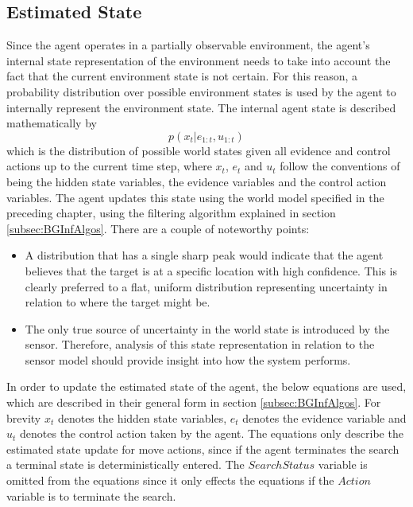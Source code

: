 \subsection{Estimated State}
\workinprogress
Since the agent operates in a partially observable environment, the agent's internal state representation of the environment needs to take into account the fact that the current environment state is not certain. For this reason, a probability distribution over possible environment states is used by the agent to internally represent the environment state. The internal agent state is described mathematically by 
\[p(x_t | e_{1:t}, u_{1:t})\]
which is the distribution of possible world states given all evidence and control actions up to the current time step, where $x_t$, $e_t$ and $u_t$ follow the conventions of being the hidden state variables, the evidence variables and the control action variables. The agent updates this state using the world model specified in the preceding chapter, using the filtering algorithm explained in section \ref{subsec:BGInfAlgos}. There are a couple of noteworthy points:
\begin{itemize}
    \item A distribution that has a single sharp peak would indicate that the agent believes that the target is at a specific location with high confidence. This is clearly preferred to a flat, uniform distribution representing uncertainty in relation to where the target might be.
    \item The only true source of uncertainty in the world state is introduced by the sensor. Therefore, analysis of this state representation in relation to the sensor model should provide insight into how the system performs.
\end{itemize}
In order to update the estimated state of the agent, the below equations are used, which are described in their general form in section \ref{subsec:BGInfAlgos}. For brevity $x_t$ denotes the hidden state variables, $e_t$ denotes the evidence variable and $u_t$ denotes the control action taken by the agent. The equations only describe the estimated state update for move actions, since if the agent terminates the search a terminal state is deterministically entered. The $SearchStatus$ variable is omitted from the equations since it only effects the equations if the $Action$ variable is to terminate the search.
\footnotesize
